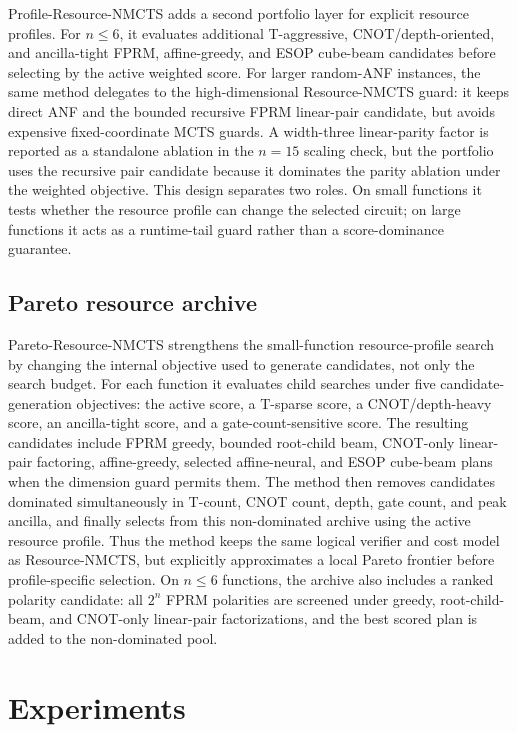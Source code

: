\documentclass[11pt]{article}
\newcommand{\method}{Resource-NMCTS}
\newcommand{\profilemethod}{Profile-Resource-NMCTS}
\newcommand{\paretomethod}{Pareto-Resource-NMCTS}
\begin{document}
\profilemethod{} adds a second portfolio layer for explicit resource profiles.
For $n\leq 6$, it evaluates additional T-aggressive, CNOT/depth-oriented, and
ancilla-tight FPRM, affine-greedy, and ESOP cube-beam candidates before
selecting by the active weighted score.  For larger random-ANF instances, the
same method delegates to the high-dimensional Resource-NMCTS guard: it keeps
direct ANF and the bounded recursive FPRM linear-pair candidate, but avoids
expensive fixed-coordinate MCTS guards.  A width-three linear-parity factor is
reported as a standalone ablation in the $n=15$ scaling check, but the
portfolio uses the recursive pair candidate because it dominates the parity
ablation under the weighted objective.
This design separates two roles.  On small functions it tests whether the
resource profile can change the selected circuit; on large functions it acts as
a runtime-tail guard rather than a score-dominance guarantee.

\subsection{Pareto resource archive}

\paretomethod{} strengthens the small-function resource-profile search by
changing the internal objective used to generate candidates, not only the
search budget.  For each function it evaluates child searches under five
candidate-generation objectives: the active score, a T-sparse score, a
CNOT/depth-heavy score, an ancilla-tight score, and a gate-count-sensitive
score.  The resulting candidates include FPRM greedy, bounded root-child beam,
CNOT-only linear-pair factoring, affine-greedy, selected affine-neural, and
ESOP cube-beam plans when the dimension guard permits them.  The method then
removes candidates dominated simultaneously in T-count, CNOT count, depth,
gate count, and peak ancilla, and finally selects from this non-dominated
archive using the active resource profile.  Thus the method keeps the same
logical verifier and cost model as \method{}, but explicitly approximates a
local Pareto frontier before profile-specific selection.
On $n\leq 6$ functions, the archive also includes a ranked polarity candidate:
all $2^n$ FPRM polarities are screened under greedy, root-child-beam, and
CNOT-only linear-pair factorizations, and the best scored plan is added to the
non-dominated pool.

\section{Experiments}
\end{document}
